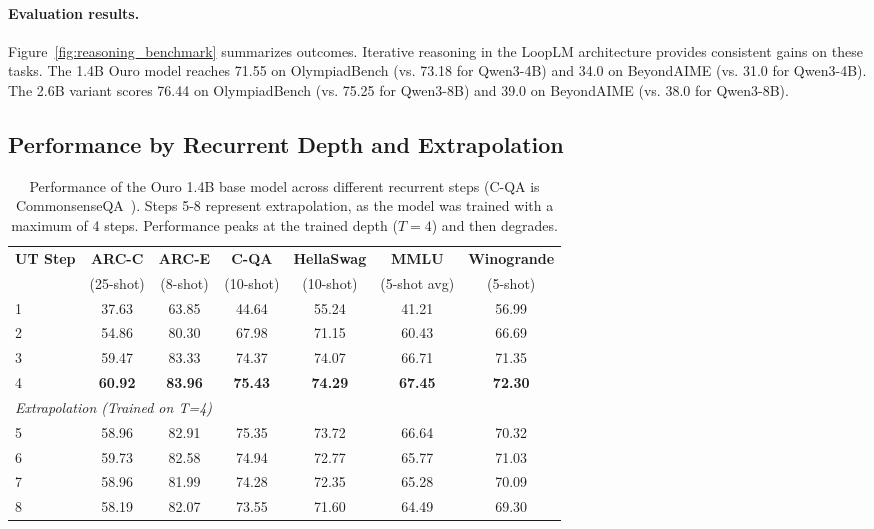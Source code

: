 \documentclass[]{bytedance_seed}
\newcommand{\1}{\mathbf{1}}
\newcommand{\ut}{LoopLM}
\begin{document}
\paragraph{Evaluation results.}
Figure~\ref{fig:reasoning_benchmark} summarizes outcomes. Iterative reasoning in the \ut{} architecture provides consistent gains on these tasks. The 1.4B Ouro model reaches 71.55 on OlympiadBench (vs. 73.18 for Qwen3-4B) and 34.0 on BeyondAIME (vs. 31.0 for Qwen3-4B). The 2.6B variant scores 76.44 on OlympiadBench (vs. 75.25 for Qwen3-8B) and 39.0 on BeyondAIME (vs. 38.0 for Qwen3-8B).

\subsection{Performance by Recurrent Depth and Extrapolation}

\begin{table}[htbp]
\centering
\small
\caption{Performance of the Ouro 1.4B base model across different recurrent steps (C-QA is CommonsenseQA~\cite{talmor-etal-2019-commonsenseqa}). Steps 5-8 represent extrapolation, as the model was trained with a maximum of 4 steps. Performance peaks at the trained depth ($T=4$) and then degrades.}
\label{tab:extrapolation_base_1_4b}
\begin{tabular}{lcccccc}
\toprule
\textbf{UT Step} & \textbf{ARC-C} & \textbf{ARC-E} & \textbf{C-QA} & \textbf{HellaSwag} & \textbf{MMLU} & \textbf{Winogrande} \\
& (25-shot) & (8-shot) & (10-shot) & (10-shot) & (5-shot avg) & (5-shot) \\
\midrule
1 & 37.63 & 63.85 & 44.64 & 55.24 & 41.21 & 56.99 \\
2 & 54.86 & 80.30 & 67.98 & 71.15 & 60.43 & 66.69 \\
3 & 59.47 & 83.33 & 74.37 & 74.07 & 66.71 & 71.35 \\
4 & \textbf{60.92} & \textbf{83.96} & \textbf{75.43} & \textbf{74.29} & \textbf{67.45} & \textbf{72.30} \\
\midrule[0.8pt]
\multicolumn{7}{l}{\textit{Extrapolation (Trained on T=4)}} \\
\midrule
5 & 58.96 & 82.91 & 75.35 & 73.72 & 66.64 & 70.32 \\
6 & 59.73 & 82.58 & 74.94 & 72.77 & 65.77 & 71.03 \\
7 & 58.96 & 81.99 & 74.28 & 72.35 & 65.28 & 70.09 \\
8 & 58.19 & 82.07 & 73.55 & 71.60 & 64.49 & 69.30 \\
\bottomrule
\end{tabular}
\end{table}
\end{document}
